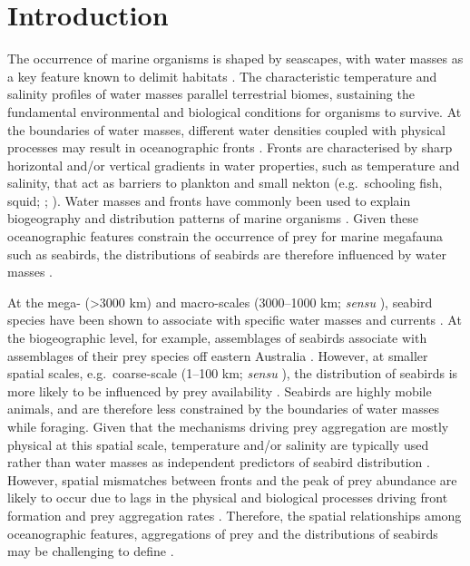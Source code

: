 \documentclass[preprint, 3p, authoryear]{elsarticle} %
\begin{document}
\newpage

\hypertarget{introduction}{%
\section{Introduction}\label{introduction}}

The occurrence of marine organisms is shaped by seascapes, with water masses as a key feature known to delimit habitats \citep{hunt1987, lalli1997}. The characteristic temperature and salinity profiles of water masses parallel terrestrial biomes, sustaining the fundamental environmental and biological conditions for organisms to survive. At the boundaries of water masses, different water densities coupled with physical processes may result in oceanographic fronts \citep[e.g.][]{collins2015}. Fronts are characterised by sharp horizontal and/or vertical gradients in water properties, such as temperature and salinity, that act as barriers to plankton and small nekton (e.g.~schooling fish, squid; \citet{olson1985}; \citet{bakun2006}). Water masses and fronts have commonly been used to explain biogeography and distribution patterns of marine organisms \citep{kinder1983, sournia1994, venables2012, scales2014, venkataramana2024}. Given these oceanographic features constrain the occurrence of prey for marine megafauna such as seabirds, the distributions of seabirds are therefore influenced by water masses \citep[e.g.][]{ribic1989, ribic2011, gall2022}.

At the mega- (\textgreater3000 km) and macro-scales (3000--1000 km; \emph{sensu} \citet{hunt1987}), seabird species have been shown to associate with specific water masses and currents \citep[e.g.][]{wahl1989, gall2022, daudt2024, hyrenbach2007}. At the biogeographic level, for example, assemblages of seabirds associate with assemblages of their prey species off eastern Australia \citep{daudt2024, sutton2017}. However, at smaller spatial scales, e.g.~coarse-scale (1--100 km; \emph{sensu} \citet{hunt1987}), the distribution of seabirds is more likely to be influenced by prey availability \citep{hunt1987, weimerskirch2007, cox2018}. Seabirds are highly mobile animals, and are therefore less constrained by the boundaries of water masses while foraging. Given that the mechanisms driving prey aggregation are mostly physical at this spatial scale, temperature and/or salinity are typically used rather than water masses as independent predictors of seabird distribution \citep[e.g.][]{evans2021, cushing2024}. However, spatial mismatches between fronts and the peak of prey abundance are likely to occur due to lags in the physical and biological processes driving front formation and prey aggregation rates \citep{franks1992, odriscoll1998}. Therefore, the spatial relationships among oceanographic features, aggregations of prey and the distributions of seabirds may be challenging to define \citep{russell1999, gremillet2008}.
\end{document}
